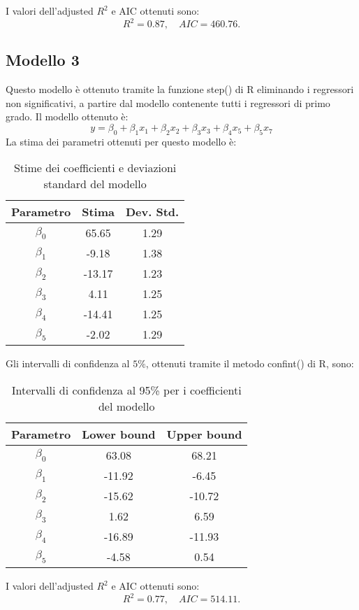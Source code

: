 I valori dell'adjusted $R^2$  e AIC ottenuti sono:
\begin{equation*}
	R^2 =   0.87, \quad AIC = 460.76.
\end{equation*}
\subsection{Modello 3}
Questo modello è ottenuto tramite la funzione step() di R eliminando i regressori non significativi, a partire dal modello contenente tutti i regressori di primo grado. Il modello ottenuto è:
\begin{equation*}
	y=\beta_0+\beta_1x_1+\beta_2x_2+\beta_3x_3+\beta_4x_5+\beta_5x_7
\end{equation*}
La stima dei parametri ottenuti per questo modello è:
\begin{table}[H]
	\centering
	\begin{tabular}{|c|c|c|}
		\hline
		\textbf{Parametro} & \textbf{Stima} & \textbf{Dev. Std.} \\
		\hline
		$\beta_0$ & 65.65  & 1.29 \\
		$\beta_1$ & -9.18  & 1.38 \\
		$\beta_2$ & -13.17 & 1.23 \\
		$\beta_3$ & 4.11   & 1.25 \\
		$\beta_4$ & -14.41 & 1.25 \\
		$\beta_5$ & -2.02  & 1.29 \\
		\hline
	\end{tabular}
	\caption{Stime dei coefficienti e deviazioni standard del modello}
	\label{tab:coef_estimates_poly}
\end{table}
Gli intervalli di confidenza al $5\%$, ottenuti tramite il metodo confint() di R, sono:
\begin{table}[H]
	\centering
	\begin{tabular}{|c|c|c|}
		\hline
		\textbf{Parametro} & \textbf{Lower bound} & \textbf{Upper bound} \\
		\hline
		$\beta_0$ & 63.08 & 68.21 \\
		$\beta_1$ & -11.92 & -6.45 \\
		$\beta_2$ & -15.62 & -10.72 \\
		$\beta_3$ & 1.62 & 6.59 \\
		$\beta_4$ & -16.89 & -11.93 \\
		$\beta_5$ & -4.58 & 0.54 \\
		\hline
	\end{tabular}
	\caption{Intervalli di confidenza al 95\% per i coefficienti del modello}
	\label{tab:ci_coefficienti}
\end{table}
I valori dell'adjusted $R^2$  e AIC ottenuti sono:
\begin{equation*}
	R^2 =    0.77, \quad AIC =  514.11.
\end{equation*}

